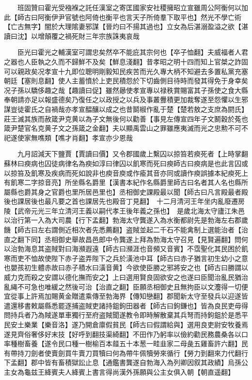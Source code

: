 　　班固贊曰霍光受襁褓之託任漢室之寄匡國家安社稷擁昭立宣雖周公阿衡何以加此【師古曰阿衡伊尹官號也阿倚也衡平也言天子所倚羣下取平也】然光不學亡術【亡古無字】闇於大理隂妻邪謀【晉灼曰不揚其過也】立女為后湛溺盈溢之欲【湛讀曰沈】以增顛覆之禍死財三年宗族誅夷哀哉

　　臣光曰霍光之輔漢室可謂忠矣然卒不能庇其宗何也【卒子恤翻】夫威福者人君之器也人臣執之久而不歸鮮不及矣【鮮息淺翻】昔孝昭之明十四而知上官桀之詐固可以親政矣况孝宣十九即位聰明剛毅知民疾苦而光久專大柄不知避去多置私黨充塞朝廷【塞則息翻】使人主蓄憤於上吏民積怨於下切齒側目待時而發其得免于身幸矣况子孫以驕侈趣之哉【趣讀曰促】雖然曏使孝宣專以禄秩賞賜富其子孫使之食大縣奉朝請亦足以報盛德矣乃復任之以政授之以兵及事叢釁積更加裁奪遂至怨懼以生邪謀豈徒霍氏之自禍哉亦孝宣醖釀以成之也昔鬬椒作亂于楚【楚若敖之支庶為閼氏】莊王滅其族而赦箴尹克黄以為子文無後何以勸善【事見左傳宣四年子文鬭穀於菟也箴尹楚官名克黄子文之孫箴之金翻】夫以顯禹雲山之罪雖應夷滅而光之忠勲不可不祀遂使家無噍類【噍才肖翻】孝宣亦少恩哉

　　九月詔減天下鹽賈【賈讀曰價】又令郡國歲上繫囚以掠笞若瘐死者【上時掌翻蘇林曰瘐病也囚徒病律名為瘐如淳曰律囚以飢寒而死曰瘐師古曰瘐病是也此言囚或以掠笞及飢寒及疾病而死如說非也瘐音庾或作瘉其音亦同或讀作瘐誤據本紀瘐死上有飢寒二字掠音亮】所坐縣名爵里【漢書本紀作名縣爵里師古曰名者其人名也縣所屬縣也爵其身之官爵也里所居邑里也】丞相御史課殿最以聞【師古曰凡言殿最者殿後也課居後也最凡要之首也課居先也殿音丁見翻】　十二月清河王年坐内亂廢遷房陵【武帝元光三年立清河王義以嗣代孝王後年義之孫也】　是歲北海太守廬江朱邑以治行第一入為大司農【行下孟翻】勃海太守龔遂入為水衡都尉先是勃海左右郡歲饑【師古曰左右謂側近相次者先悉薦翻】盗賊並起二千石不能禽制上選能治者【治直之翻下同】丞相御史舉故昌邑郎中令龔遂上拜為勃海太守召見【見賢遍翻】問何以治勃海息其盗賊對曰海瀕遐遠【師古曰瀕涯也音頻又音賓】不霑聖化其民困於飢寒而吏不恤故使陛下赤子盗弄陛下之兵於潢池中耳【師古曰赤子猶言初生幼小之意也嬰孩初生體赤故曰赤子積水曰潢音黄】今欲使臣勝之邪將安之也【師古曰勝謂以威力克而殺之安謂以德化撫而安之】上曰選用賢良固欲安之也遂曰臣聞治亂民猶治亂䋲不可急也唯緩之然後可治【治直之翻】臣願丞相御史且無拘臣以文灋得一切便宜從事上許焉加賜黄金贈遣乘傳至勃海界【傳知戀翻】郡聞新太守至發兵以迎遂皆遣還移書敕屬縣悉罷逐捕盗賊吏諸持鉏鉤田器者【師古曰鉤鎌也】皆為良民吏毋得問持兵者乃為賊遂單車獨行至府盗賊聞遂教令即時解散棄其兵弩而持鉤鉏於是悉平民安土樂業【樂音洛】遂乃開倉廪假貧民【師古曰假謂給與】選用良吏尉安牧養焉遂見齊俗奢侈好末技【好呼到翻技渠綺翻】不田作乃躬率以儉約勸民務農桑各以口率種樹畜養【遂令民口種一樹榆百本䪥五十本葱一畦韭家二母彘五雞畜許六翻】民有帶持刀劍者使賣劍買牛賣刀買犢曰何為帶牛佩犢勞來循行【勞力到翻來力代翻行下孟翻】郡中皆有畜積獄訟止息【通鑑書龔遂自勃海入為列卿因叙其政績】烏孫公主女為龜兹王絳賓夫人絳賓上書言得尚漢外孫願與公主女俱入朝【朝直遥翻】

